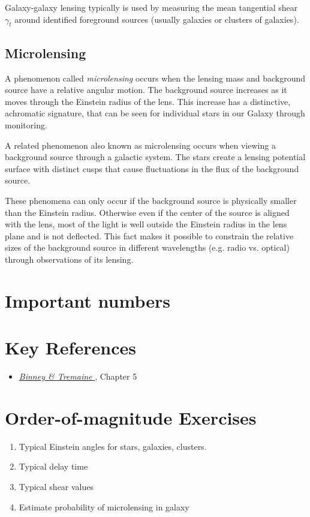 Galaxy-galaxy lensing typically is used by measuring the mean
tangential shear $\gamma_t$ around identified foreground sources
(usually galaxies or clusters of galaxies). 

\subsection{Microlensing}

A phenomenon called {\it microlensing} occurs when the lensing mass
and background source have a relative angular motion. The background
source increases as it moves through the Einstein radius of the
lens. This increase has a distinctive, achromatic signature, that can
be seen for individual stars in our Galaxy through monitoring.

A related phenomenon also known as microlensing occurs when viewing a
background source through a galactic system. The stars create a
lensing potential surface with distinct cusps that cause fluctuations
in the flux of the background source.

These phenomena can only occur if the background source is physically
smaller than the Einstein radius. Otherwise even if the center of the
source is aligned with the lens, most of the light is well outside the
Einstein radius in the lens plane and is not deflected. This fact
makes it possible to constrain the relative sizes of the background
source in different wavelengths (e.g. radio vs. optical) through
observations of its lensing.

\section{Important numbers}

\section{Key References}

\begin{itemize}
  \item
    \href{http://adsabs.harvard.edu/abs/2000asqu.book.....C}{
    {\it Binney \& Tremaine}
      \citet{cox00a}}, Chapter 5
\end{itemize}

\section{Order-of-magnitude Exercises}

\begin{enumerate} 
\item Typical Einstein angles for stars, galaxies, clusters.
\item Typical delay time
\item Typical shear values
\item Estimate probability of microlensing in galaxy
\end{enumerate}   

